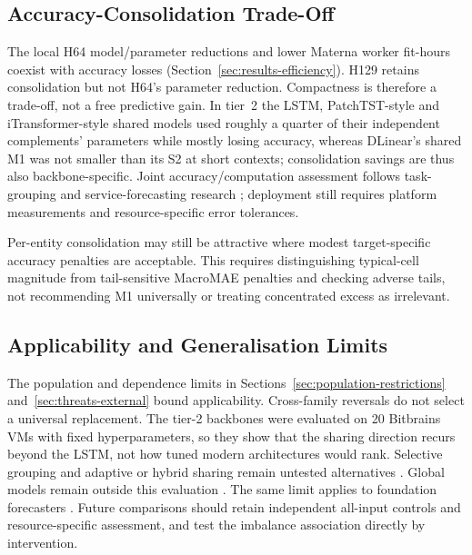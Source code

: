 \documentclass[a4paper,fleqn]{cas-dc}
\begin{document}
\subsection{Accuracy-Consolidation Trade-Off}
\label{sec:discussion-efficiency}

The local H64 model/parameter reductions and lower Materna worker fit-hours
coexist with accuracy losses (Section~\ref{sec:results-efficiency}).
H129 retains consolidation but not H64's parameter reduction. Compactness is
therefore a trade-off, not a free predictive gain. In tier~2 the LSTM,
PatchTST-style and iTransformer-style shared models used roughly a quarter
of their independent complements' parameters while mostly losing accuracy,
whereas DLinear's shared M1 was not smaller than its S2 at short contexts;
consolidation savings are thus also backbone-specific. Joint accuracy/computation
assessment follows task-grouping and service-forecasting research
\citep{Standley2020TaskGrouping,Syu2017DynamicQoS}; deployment still requires
platform measurements and resource-specific error tolerances.

Per-entity consolidation may still be attractive where modest target-specific
accuracy penalties are acceptable. This requires distinguishing typical-cell
magnitude from tail-sensitive MacroMAE penalties and checking adverse tails,
not recommending M1 universally or treating concentrated excess as irrelevant.

\subsection{Applicability and Generalisation Limits}
\label{sec:discussion-applicability}

The population and dependence limits in Sections~\ref{sec:population-restrictions}
and~\ref{sec:threats-external} bound applicability. Cross-family reversals do not
select a universal replacement. The tier-2 backbones were evaluated on 20
Bitbrains VMs with fixed hyperparameters, so they show that the sharing
direction recurs beyond the LSTM, not how tuned modern architectures would
rank. Selective grouping and adaptive or hybrid sharing remain untested
alternatives
\citep{Fifty2021TaskGroupings,Yu2020GradientSurgery,Nochumsohn2025MTLinear}.
Global models remain outside this evaluation
\citep{MonteroManso2021GlobalForecasting}.
The same limit applies to foundation forecasters
\citep{DiMenna2026RuntimeForecasting}. Future comparisons should retain
independent all-input controls and resource-specific assessment, and test
the imbalance association directly by intervention.
\end{document}
